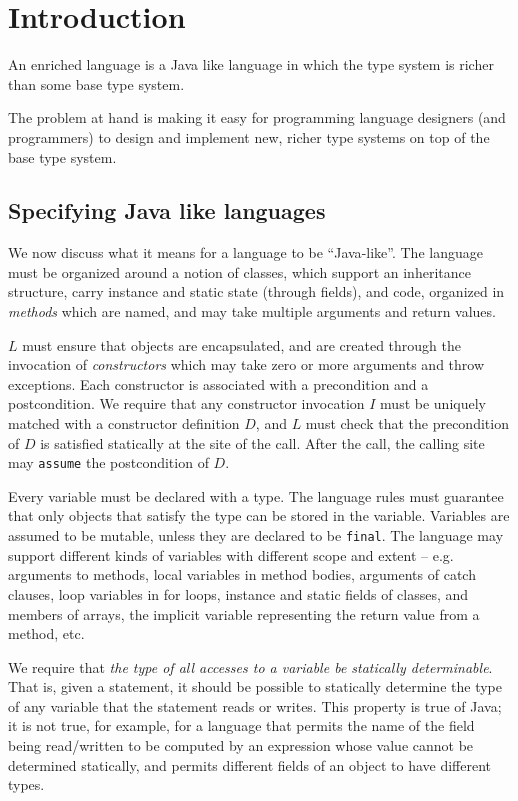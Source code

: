 \documentclass{article}
\def\java{{\sf Java}}
\begin{document}
\section{Introduction}


An enriched language is a \java{} like language in which the type
system is richer than some base type system.

The problem at hand is making it easy for programming language
designers (and programmers) to design and implement new, richer type
systems on top of the base type system.

\subsection{Specifying \java{} like languages}
We now discuss what it means for a language to be ``\java-like''.  The
language must be organized around a notion of classes, which support
an inheritance structure, carry instance and static state (through
fields), and code, organized in {\em methods} which are named, and may
take multiple arguments and return values. 

$L$ must ensure that objects are encapsulated, and are created through
the invocation of {\em constructors} which may take zero or more
arguments and throw exceptions. Each constructor is associated with a
precondition and a postcondition. We require that any constructor
invocation $I$ must be uniquely matched with a constructor definition
$D$, and $L$ must check that the precondition of $D$ is satisfied
statically at the site of the call. After the call, the calling site
may {\tt assume} the postcondition of $D$.

Every variable must be declared with a type. The language rules must
guarantee that only objects that satisfy the type can be stored in the
variable.  Variables are assumed to be mutable, unless they are
declared to be {\tt final}. The language may support different kinds
of variables with different scope and extent -- e.g.{} arguments to
methods, local variables in method bodies, arguments of catch clauses,
loop variables in for loops, instance and static fields of
classes, and members of arrays, the implicit variable representing the
return value from a method, etc.

We require that {\em the type of all accesses to a variable be
statically determinable}. That is, given a statement, it should be
possible to statically determine the type of any variable that the
statement reads or writes. This property is true of \java{}; it is not
true, for example, for a language that permits the name of the field
being read/written to be computed by an expression whose value cannot
be determined statically, and permits different fields of an object to
have different types.
\end{document}
